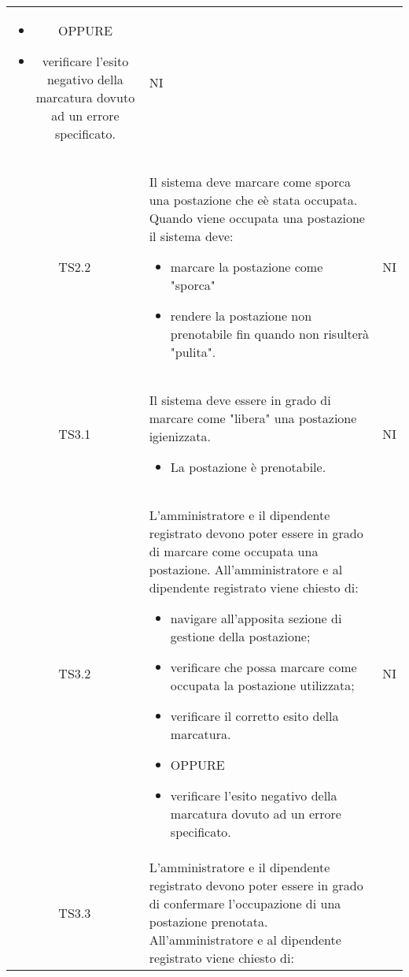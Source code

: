 {\begin{longtable}{ c C{11cm} c }
\begin{itemize}
            \item [] OPPURE
            \item verificare l'esito negativo della marcatura dovuto ad un errore specificato.
        \end{itemize}&
        NI\\
        TS2.2&
        Il sistema deve marcare come sporca una postazione che e\`{e} stata occupata.\newline
        Quando viene occupata una postazione il sistema deve:
        \begin{itemize}
            \item marcare la postazione come "sporca"
            \item rendere la postazione non prenotabile fin quando non risulter\`{a} "pulita".
        \end{itemize}&
        NI\\
        TS3.1&
        Il sistema deve essere in grado di marcare come "libera" una postazione igienizzata.\newline
        \begin{itemize}
            \item La postazione \`{e} prenotabile.
        \end{itemize}&
        NI\\
        TS3.2&
        L'amministratore e il dipendente registrato devono poter essere in grado di marcare come occupata una postazione.\newline
        All'amministratore e al dipendente registrato viene chiesto di:
        \begin{itemize}
            \item navigare all'apposita sezione di gestione della postazione;
            \item verificare che possa marcare come occupata la postazione utilizzata;
            \item verificare il corretto esito della marcatura.
            \item [] OPPURE
            \item verificare l'esito negativo della marcatura dovuto ad un errore specificato.
        \end{itemize}&
        NI\\
        TS3.3&
        L'amministratore e il dipendente registrato devono poter essere in grado di confermare l'occupazione di una postazione prenotata.\newline
        All'amministratore e al dipendente registrato viene chiesto di:

\end{longtable}}
